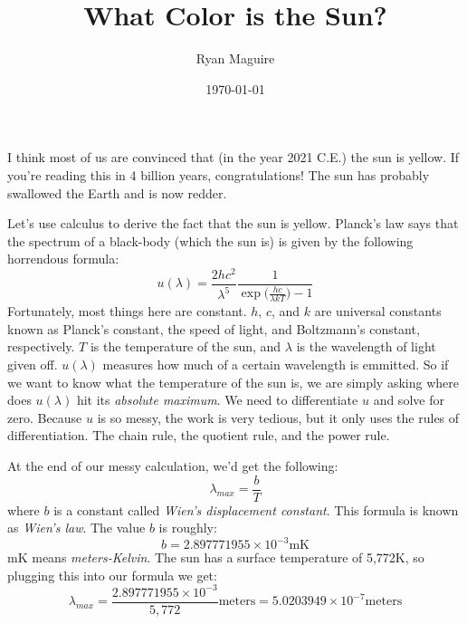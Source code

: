 \documentclass{article}
\title{What Color is the Sun?}
\author{Ryan Maguire}
\date{\today}
\begin{document}
    \maketitle
    I think most of us are convinced that (in the year 2021 C.E.) the sun
    is yellow. If you're reading this in 4 billion years, congratulations! The
    sun has probably swallowed the Earth and is now redder.
    \par\hfill\par
    Let's use calculus to derive the fact that the sun is yellow. Planck's
    law says that the spectrum of a black-body (which the sun is) is given by
    the following horrendous formula:
    \begin{equation}
        u(\lambda)=
            \frac{2hc^{2}}{\lambda^{5}}
                \frac{1}{\exp\big(\frac{hc}{\lambda{k}T})-1}
    \end{equation}
    Fortunately, most things here are constant. $h$, $c$, and $k$ are universal
    constants known as Planck's constant, the speed of light, and
    Boltzmann's constant, respectively. $T$ is the temperature of the sun,
    and $\lambda$ is the wavelength of light given off. $u(\lambda)$ measures
    how much of a certain wavelength is emmitted. So if we want to know what
    the temperature of the sun is, we are simply asking where does $u(\lambda)$
    hit its \textit{absolute maximum}. We need to differentiate $u$ and solve
    for zero. Because $u$ is so messy, the work is very tedious, but it only
    uses the rules of differentiation. The chain rule, the quotient rule, and
    the power rule.
    \par\hfill\par
    At the end of our messy calculation, we'd get the following:
    \begin{equation}
        \lambda_{max}=\frac{b}{T}
    \end{equation}
    where $b$ is a constant called
    \textit{Wien's displacement constant}. This formula is known as
    \textit{Wien's law}. The value $b$ is roughly:
    \begin{equation}
        b=2.897771955\times{10}^{-3}\textrm{mK}
    \end{equation}
    mK means \textit{meters-Kelvin}. The sun has a surface temperature of
    5,772K, so plugging this into our formula we get:
    \begin{equation}
        \lambda_{max}=\frac{2.897771955\times{10}^{-3}}{5,772}\textrm{meters}
            =5.0203949\times{10}^{-7}\textrm{meters}
    \end{equation}
\end{document}
